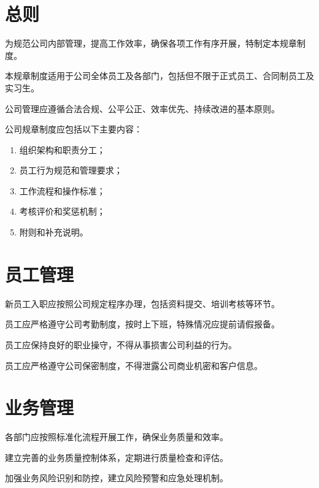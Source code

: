 \documentclass[UTF8]{ctexart}
\author{} %
\date{}   %
\begin{document}
\maketitle

\section{总则}

为规范公司内部管理，提高工作效率，确保各项工作有序开展，特制定本规章制度。

本规章制度适用于公司全体员工及各部门，包括但不限于正式员工、合同制员工及实习生。

公司管理应遵循合法合规、公平公正、效率优先、持续改进的基本原则。

公司规章制度应包括以下主要内容：
\begin{enumerate}
    \item 组织架构和职责分工；
    \item 员工行为规范和管理要求；
    \item 工作流程和操作标准；
    \item 考核评价和奖惩机制；
    \item 附则和补充说明。
\end{enumerate}

\section{员工管理}

新员工入职应按照公司规定程序办理，包括资料提交、培训考核等环节。

员工应严格遵守公司考勤制度，按时上下班，特殊情况应提前请假报备。

员工应保持良好的职业操守，不得从事损害公司利益的行为。

员工应严格遵守公司保密制度，不得泄露公司商业机密和客户信息。

\section{业务管理}

各部门应按照标准化流程开展工作，确保业务质量和效率。

建立完善的业务质量控制体系，定期进行质量检查和评估。

加强业务风险识别和防控，建立风险预警和应急处理机制。
\end{document}
